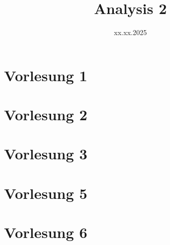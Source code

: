 \documentclass[]{scrbook}
\title{Analysis 2}
\author{}
\date{xx.xx.2025}
\begin{document}
\maketitle
\newpage
\tableofcontents
\newpage

\section{Vorlesung 1} 


\section{Vorlesung 2}


\section{Vorlesung 3}


\section{Vorlesung 5}


\section{Vorlesung 6}

\end{document}

